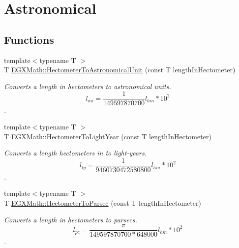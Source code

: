 \hypertarget{group___e_g_x_math-_conversions-_length_conversions-_s_i-_hectometer-_astronomical}{}\section{Astronomical}
\label{group___e_g_x_math-_conversions-_length_conversions-_s_i-_hectometer-_astronomical}
\subsection*{Functions}
\begin{DoxyCompactItemize}
\item 
{\footnotesize template$<$typename T $>$ }\\T \mbox{\hyperlink{group___e_g_x_math-_conversions-_length_conversions-_s_i-_hectometer-_astronomical_gaf66d80d2e1aeac562f9a5b67626cc46f}{E\+G\+X\+Math\+::\+Hectometer\+To\+Astronomical\+Unit}} (const T length\+In\+Hectometer)
\begin{DoxyCompactList}\small\item\em Converts a length in hectometers to astronomical units. \[ l_{au}= \frac{1}{149597870700} l_{hm} * 10^{2} \]. \end{DoxyCompactList}\item 
{\footnotesize template$<$typename T $>$ }\\T \mbox{\hyperlink{group___e_g_x_math-_conversions-_length_conversions-_s_i-_hectometer-_astronomical_ga71004aaba27ec49989b80e41e2075376}{E\+G\+X\+Math\+::\+Hectometer\+To\+Light\+Year}} (const T length\+In\+Hectometer)
\begin{DoxyCompactList}\small\item\em Converts a length hectometers in to light-\/years. \[ l_{ly}= \frac{1}{9460730472580800} l_{hm} * 10^{2} \]. \end{DoxyCompactList}\item 
{\footnotesize template$<$typename T $>$ }\\T \mbox{\hyperlink{group___e_g_x_math-_conversions-_length_conversions-_s_i-_hectometer-_astronomical_gae327abefa3e19b130dfde5d8e1f4a4ab}{E\+G\+X\+Math\+::\+Hectometer\+To\+Parsec}} (const T length\+In\+Hectometer)
\begin{DoxyCompactList}\small\item\em Converts a length in hectometers to parsecs. \[ l_{pc}=\frac{\pi}{149597870700 * 648000} l_{hm} * 10^{2} \]. \end{DoxyCompactList}\end{DoxyCompactItemize}


